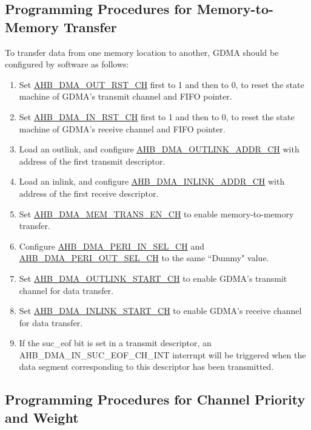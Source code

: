 \documentclass[main\_\_EN.tex]{subfiles}
\begin{document}
\subsection{Programming Procedures for Memory-to-Memory Transfer}
To transfer data from one memory location to another, GDMA should be configured by software as follows:
\begin{enumerate}
    \item Set \hyperref[fielddesc:AHBDMAOUTRSTCHN]{AHB\_DMA\_OUT\_RST\_CH} first to 1 and then to 0, to reset the state machine of GDMA's transmit channel and FIFO pointer.
    \item Set \hyperref[fielddesc:AHBDMAINRSTCHN]{AHB\_DMA\_IN\_RST\_CH} first to 1 and then to 0, to reset the state machine of GDMA's receive channel and FIFO pointer.
    \item Load an outlink, and configure \hyperref[fielddesc:AHBDMAOUTLINKADDRCHN]{AHB\_DMA\_OUTLINK\_ADDR\_CH} with address of the first transmit descriptor.
    \item Load an inlink, and configure \hyperref[fielddesc:AHBDMAINLINKADDRCHN]{AHB\_DMA\_INLINK\_ADDR\_CH} with address of the first receive descriptor.
    \item Set \hyperref[fielddesc:AHBDMAMEMTRANSENCHN]{AHB\_DMA\_MEM\_TRANS\_EN\_CH} to enable memory-to-memory transfer.
    \item Configure \hyperref[fielddesc:AHBDMAPERIINSELCHN]{AHB\_DMA\_PERI\_IN\_SEL\_CH} and \hyperref[fielddesc:AHBDMAPERIOUTSELCHN]{AHB\_DMA\_PERI\_OUT\_SEL\_CH} to the same ``Dummy" value.
    \item Set \hyperref[fielddesc:AHBDMAOUTLINKSTARTCHN]{AHB\_DMA\_OUTLINK\_START\_CH} to enable GDMA's transmit channel for data transfer.
    \item Set \hyperref[fielddesc:AHBDMAINLINKSTARTCHN]{AHB\_DMA\_INLINK\_START\_CH} to enable GDMA's receive channel for data transfer.
    \item If the suc\_eof bit is set in a transmit descriptor, an AHB\_DMA\_IN\_SUC\_EOF\_CH\_INT interrupt will be triggered when the data segment corresponding to this descriptor has been transmitted.
\end{enumerate}

\subsection{Programming Procedures for Channel Priority and Weight}
\end{document}
